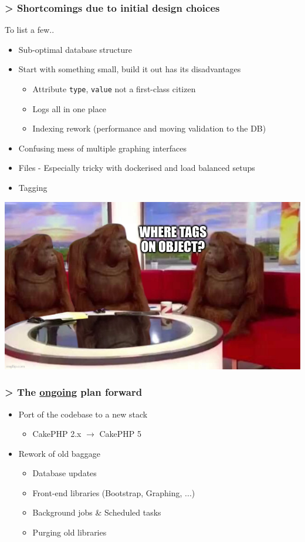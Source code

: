 \begin{frame}
    \frametitle{> Shortcomings due to initial design choices}
    To list a few..
    \begin{itemize}
        \item Sub-optimal database structure
        \item Start with something small, build it out has its disadvantages
        \begin{itemize}
            \item Attribute \texttt{type}, \texttt{value} not a first-class citizen
            \item Logs all in one place
            \item Indexing rework (performance and moving validation to the DB)
        \end{itemize}
        \item Confusing mess of multiple graphing interfaces
        \item Files - Especially tricky with dockerised and load balanced setups
        \item Tagging
    \end{itemize}
    \begin{center}
        \includegraphics[width=0.5\linewidth]{pictures/where-tags-objects.jpeg}
    \end{center}
\end{frame}

\begin{frame}
    \frametitle{> The \underline{ongoing} plan forward}
    \begin{itemize}
        \item Port of the codebase to a new stack
        \begin{itemize}
            \item CakePHP 2.x $\rightarrow$ CakePHP 5
        \end{itemize}
        \item Rework of old baggage
        \begin{itemize}
            \item Database updates
            \item Front-end libraries (Bootstrap, Graphing, ...)
            \item Background jobs \& Scheduled tasks
            \item Purging old libraries
        \end{itemize}
    \end{itemize}
\end{frame}

